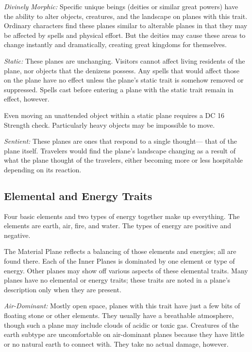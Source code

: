 \documentclass{article}
\begin{document}
\textit{Divinely Morphic: }Specific unique beings (deities or similar great powers) 
have the ability to alter objects, creatures, and the landscape on planes with 
this trait. Ordinary characters find these planes similar to alterable planes in 
that they may be affected by spells and physical effort. But the deities may cause 
these areas to change instantly and dramatically, creating great kingdoms for themselves. 

\textit{Static: }These planes are unchanging. Visitors cannot affect living residents 
of the plane, nor objects that the denizens possess. Any spells that would affect 
those on the plane have no effect unless the plane's static trait is somehow removed 
or suppressed. Spells cast before entering a plane with the static trait remain 
in effect, however.

Even moving an unattended object within a static plane requires a DC 16 Strength 
check. Particularly heavy objects may be impossible to move.

\textit{Sentient: }These planes are ones that respond to a single thought--- that 
of the plane itself. Travelers would find the plane's landscape changing as a result 
of what the plane thought of the travelers, either becoming more or less hospitable 
depending on its reaction.

\vspace{12pt}
\subsection*{Elemental and Energy Traits}

Four basic elements and two types of energy together make up everything. The elements 
are earth, air, fire, and water. The types of energy are positive and negative.

The Material Plane reflects a balancing of those elements and energies; all are 
found there. Each of the Inner Planes is dominated by one element or type of energy. 
Other planes may show off various aspects of these elemental traits. Many planes 
have no elemental or energy traits; these traits are noted in a plane's description 
only when they are present.

\textit{Air-Dominant:} Mostly open space, planes with this trait have just a few 
bits of floating stone or other elements. They usually have a breathable atmosphere, 
though such a plane may include clouds of acidic or toxic gas. Creatures of the 
earth subtype are uncomfortable on air-dominant planes because they have little 
or no natural earth to connect with. They take no actual damage, however.
\end{document}
